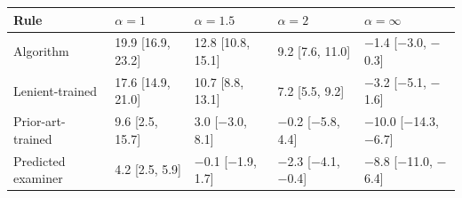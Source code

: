 \begin{tabular}{lllll}
\toprule
Rule & $\alpha = 1$ & $\alpha = 1.5$ & $\alpha = 2$ & $\alpha = \infty$ \\
\midrule
Algorithm & 19.9 [16.9, 23.2] & 12.8 [10.8, 15.1] & 9.2 [7.6, 11.0] & $-$1.4 [$-$3.0, $-$0.3] \\
Lenient-trained & 17.6 [14.9, 21.0] & 10.7 [8.8, 13.1] & 7.2 [5.5, 9.2] & $-$3.2 [$-$5.1, $-$1.6] \\
Prior-art-trained & 9.6 [2.5, 15.7] & 3.0 [$-$3.0, 8.1] & $-$0.2 [$-$5.8, 4.4] & $-$10.0 [$-$14.3, $-$6.7] \\
Predicted examiner & 4.2 [2.5, 5.9] & $-$0.1 [$-$1.9, 1.7] & $-$2.3 [$-$4.1, $-$0.4] & $-$8.8 [$-$11.0, $-$6.4] \\
\bottomrule
\end{tabular}
